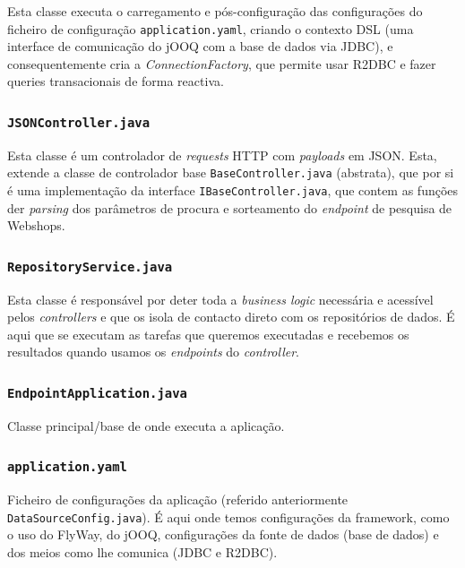 Esta classe executa o carregamento e pós-configuração das configurações do ficheiro de configuração \texttt{application.yaml}, criando o contexto DSL (uma interface de comunicação do jOOQ com a base de dados via JDBC), e consequentemente cria a \textit{ConnectionFactory}, que permite usar R2DBC e fazer queries transacionais de forma reactiva.

\subsubsection*{\texttt{JSONController.java}}

Esta classe é um controlador de \textit{requests} HTTP com \textit{payloads} em JSON. Esta, extende a classe de controlador base \texttt{BaseController.java} (abstrata), que por si é uma implementação da interface \texttt{IBaseController.java}, que contem as funções der \textit{parsing} dos parâmetros de procura e sorteamento do \textit{endpoint} de pesquisa de Webshops.

\subsubsection*{\texttt{RepositoryService.java}}

Esta classe é responsável por deter toda a \textit{business logic} necessária e acessível pelos \textit{controllers} e que os isola de contacto direto com os repositórios de dados. É aqui que se executam as tarefas que queremos executadas e recebemos os resultados quando usamos os \textit{endpoints} do \textit{controller}.

\newpage

\subsubsection*{\texttt{EndpointApplication.java}}

Classe principal/base de onde executa a aplicação.

\subsubsection*{\texttt{application.yaml}}

Ficheiro de configurações da aplicação (referido anteriormente \texttt{DataSourceConfig.java}). É aqui onde temos configurações da framework, como o uso do FlyWay, do jOOQ, configurações da fonte de dados (base de dados) e dos meios como lhe comunica (JDBC e R2DBC).


